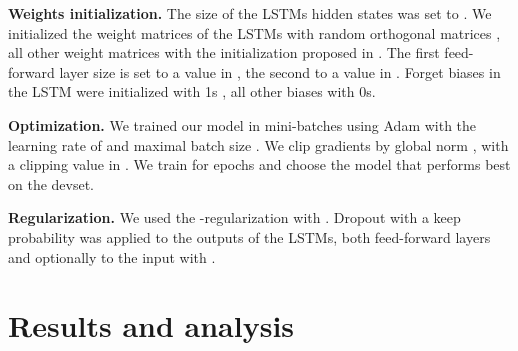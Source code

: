 \documentclass[11pt,letterpaper]{article}
\begin{document}
\textbf{Weights initialization.} The size of the LSTMs hidden states was set to  . We initialized the weight matrices of the LSTMs with random orthogonal matrices \cite{Henaff2016RecurrentON}, all other weight matrices with the initialization proposed in \citet{He2015DelvingDI}. The first feed-forward layer size is set to a value in , the second to a value in . Forget biases in the LSTM were initialized with 1s \cite{Jzefowicz2015AnEE}, all other biases with 0s.

\textbf{Optimization.} We trained our model in mini-batches using Adam
\cite{kingma2014adam} with 
the learning rate of 
and maximal batch size
.
We clip gradients by global norm \cite{Pascanu2013OnTD}, with 
a 
clipping value in . We train 
for  epochs and choose the model 
that performs best on
the devset. 

\textbf{Regularization.} We used the 
-regularization with . Drop\-out \cite{Srivastava2014DropoutAS} with a 
keep pro\-ba\-bi\-li\-ty   was applied to the outputs of the LSTMs, both feed-forward layers
and optionally to the input with .


 	
\section{Results and analysis}
\end{document}
